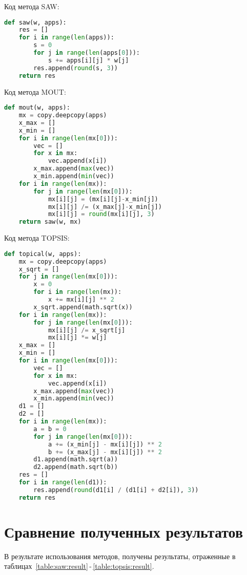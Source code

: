 Код метода SAW:
\begin{lstlisting}[language=Python
, caption=\leftline{doc.py}
, label=lst:doc]
def saw(w, apps):
	res = []
	for i in range(len(apps)):
		s = 0
		for j in range(len(apps[0])):
			s += apps[i][j] * w[j]
		res.append(round(s, 3))
	return res
\end{lstlisting}

Код метода MOUT:
\begin{lstlisting}[language=Python]
def mout(w, apps):
	mx = copy.deepcopy(apps)
	x_max = []
	x_min = []
	for i in range(len(mx[0])):
		vec = []
		for x in mx:
			vec.append(x[i])
		x_max.append(max(vec))
		x_min.append(min(vec))
	for i in range(len(mx)):
		for j in range(len(mx[0])):
			mx[i][j] = (mx[i][j]-x_min[j])
			mx[i][j] /= (x_max[j]-x_min[j])
			mx[i][j] = round(mx[i][j], 3)
	return saw(w, mx)
\end{lstlisting}

Код метода TOPSIS:
\begin{lstlisting}[language=Python]
def topical(w, apps):
	mx = copy.deepcopy(apps)
	x_sqrt = []
	for j in range(len(mx[0])):
		x = 0
		for i in range(len(mx)):
			x += mx[i][j] ** 2
		x_sqrt.append(math.sqrt(x))
	for i in range(len(mx)):
		for j in range(len(mx[0])):
			mx[i][j] /= x_sqrt[j]
			mx[i][j] *= w[j]
	x_max = []
	x_min = []
	for i in range(len(mx[0])):
		vec = []
		for x in mx:
			vec.append(x[i])
		x_max.append(max(vec))
		x_min.append(min(vec))
	d1 = []
	d2 = []
	for i in range(len(mx)):
		a = b = 0
		for j in range(len(mx[0])):
			a += (x_min[j] - mx[i][j]) ** 2
			b += (x_max[j] - mx[i][j]) ** 2
		d1.append(math.sqrt(a))
		d2.append(math.sqrt(b))
	res = []
	for i in range(len(d1)):
		res.append(round(d1[i] / (d1[i] + d2[i]), 3))
	return res
\end{lstlisting}

\section{Сравнение полученных результатов}
В результате использования методов, получены результаты, отраженные
в таблицах~\ref{table:saw:result}\,-\,\ref{table:topsis:result}.

